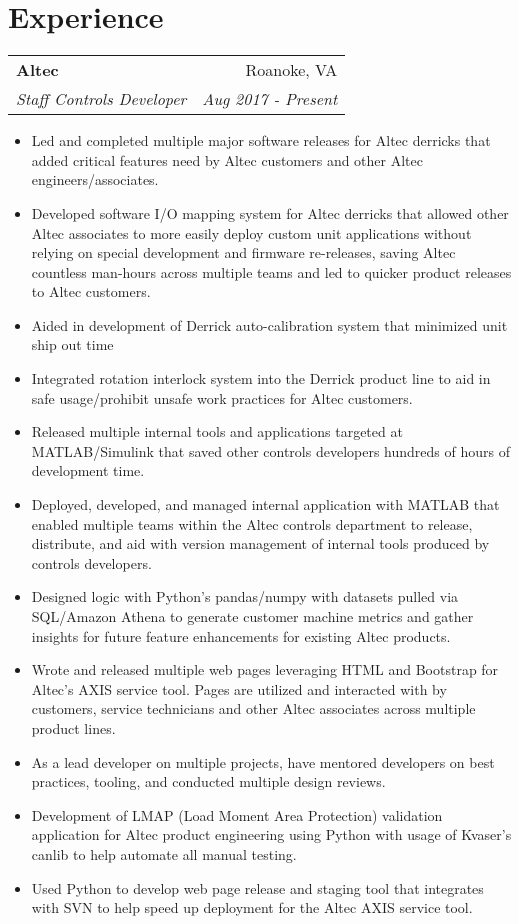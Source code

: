\documentclass[letterpaper,11pt]{article}
\makeatletter
\newcommand{\resumeItemNoTitle}[1]{
  \item\small{
    {#1 \vspace{-2pt}}
  }
}
\newcommand{\resumeHeading}[4]{
    \begin{tabular*}{0.99\textwidth}[t]{l@{\extracolsep{\fill}}r}
      \textbf{#1} & #2 \\
      \textit{\small#3} & \textit{\small #4} \\
    \end{tabular*}\vspace{-2pt}
}
\newcommand{\resumeItemListStart}{\begin{itemize}[itemsep=0em]}
\newcommand{\resumeItemListEnd}{\end{itemize}\vspace{-5pt}}
\makeatother
\begin{document}
\section{Experience}
    \resumeHeading
      {Altec}{Roanoke, VA}
      {Staff Controls Developer}{Aug 2017 - Present}
      \resumeItemListStart
        \resumeItemNoTitle{
          Led and completed multiple major software releases for Altec derricks that added critical features need by Altec customers and other Altec engineers/associates.
        }
        \resumeItemNoTitle{
          Developed software I/O mapping system for Altec derricks that allowed other Altec associates to more easily deploy custom unit applications without relying on special development and firmware re-releases, saving Altec countless man-hours across multiple teams and led to quicker product releases to Altec customers.
        }
        \resumeItemNoTitle{
          Aided in development of Derrick auto-calibration system that minimized unit ship out time
        }
        \resumeItemNoTitle{
          Integrated rotation interlock system into the Derrick product line to aid in safe usage/prohibit unsafe work practices for Altec customers.
        }
        \resumeItemNoTitle{
          Released multiple internal tools and applications targeted at MATLAB/Simulink that saved other controls developers hundreds of hours of development time.
        }
        \resumeItemNoTitle{
          Deployed, developed, and managed internal application with MATLAB that enabled multiple teams within the Altec controls department to release, distribute, and aid with version management of internal tools produced by controls developers.
        }
        \resumeItemNoTitle{
          Designed logic with Python's pandas/numpy with datasets pulled via SQL/Amazon Athena to generate customer machine metrics and gather insights for future feature enhancements for existing Altec products.
        }
        \resumeItemNoTitle{
          Wrote and released multiple web pages leveraging HTML and Bootstrap for Altec's AXIS service tool. Pages are utilized and interacted with by customers, service technicians and other Altec associates across multiple product lines.
        }
        \resumeItemNoTitle{
          As a lead developer on multiple projects, have mentored developers on best practices, tooling, and conducted multiple design reviews.
        }
        \resumeItemNoTitle{
          Development of LMAP (Load Moment Area Protection) validation application for Altec product engineering using Python with usage of Kvaser's canlib to help automate all manual testing.
        }
        \resumeItemNoTitle{
          Used Python to develop web page release and staging tool that integrates with SVN to help speed up deployment for the Altec AXIS service tool.
        }
      \resumeItemListEnd
\end{document}
